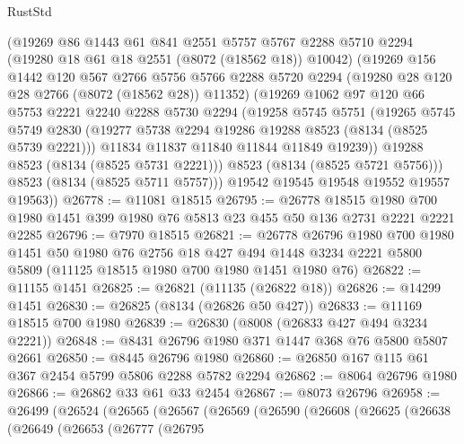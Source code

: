 \begin{lexlean}{RustStd}
\begin{coremodule}
{\begin{coremodule}
{{{{{{{{{{{{{{{{{{{{{{{{{{{{{{{{{{{{{{{{{{{{{{{{{{{{{        (@19269
          @86
          @1443
          @61
          @841
          @2551
          @5757
          @5767
          @2288
          @5710
          @2294
          (@19280 @18 @61 @18 @2551 (@8072 (@18562 @18)) @10042)
          (@19269
            @156
            @1442
            @120
            @567
            @2766
            @5756
            @5766
            @2288
            @5720
            @2294
            (@19280 @28 @120 @28 @2766 (@8072 (@18562 @28)) @11352)
            (@19269
              @1062
              @97
              @120
              @66
              @5753
              @2221
              @2240
              @2288
              @5730
              @2294
              (@19258
                @5745
                @5751
                (@19265
                  @5745
                  @5749
                  @2830
                  (@19277 @5738 @2294 @19286 @19288 @8523 (@8134 (@8525 @5739 @2221)))
                  @11834
                  @11837
                  @11840
                  @11844
                  @11849
                  @19239))
              @19288
              @8523
              (@8134 (@8525 @5731 @2221)))
            @8523
            (@8134 (@8525 @5721 @5756)))
          @8523
          (@8134 (@8525 @5711 @5757)))
        @19542
        @19545
        @19548
        @19552
        @19557
        @19563))
@26778 := @11081 @18515
@26795 := @26778
    @18515
    @1980
    @700
    @1980
    @1451
    @399
    @1980
    @76
    @5813
    @23
    @455
    @50
    @136
    @2731
    @2221
    @2221
    @2285
@26796 := @7970 @18515
@26821 := @26778
    @26796
    @1980
    @700
    @1980
    @1451
    @50
    @1980
    @76
    @2756
    @18
    @427
    @494
    @1448
    @3234
    @2221
    @5800
    @5809
    (@11125 @18515 @1980 @700 @1980 @1451 @1980 @76)
@26822 := @11155 @1451
@26825 := @26821 (@11135 (@26822 @18))
@26826 := @14299 @1451
@26830 := @26825 (@8134 (@26826 @50 @427))
@26833 := @11169 @18515 @700 @1980
@26839 := @26830 (@8008 (@26833 @427 @494 @3234 @2221))
@26848 := @8431 @26796 @1980 @371 @1447 @368 @76 @5800 @5807 @2661
@26850 := @8445 @26796 @1980
@26860 := @26850 @167 @115 @61 @367 @2454 @5799 @5806 @2288 @5782 @2294
@26862 := @8064 @26796 @1980
@26866 := @26862 @33 @61 @33 @2454
@26867 := @8073 @26796
@26958 := @26499
    (@26524
      (@26565
        (@26567
          (@26569
            (@26590
              (@26608
                (@26625
                  (@26638
                    (@26649
                      (@26653
                        (@26777
                          (@26795
}}}}}}}}}}}}}}}}}}}}}}}}}}}}}}}}}}}}}}}}}}}}}}}}}}}}}
\end{coremodule}}
\end{coremodule}
\end{lexlean}
